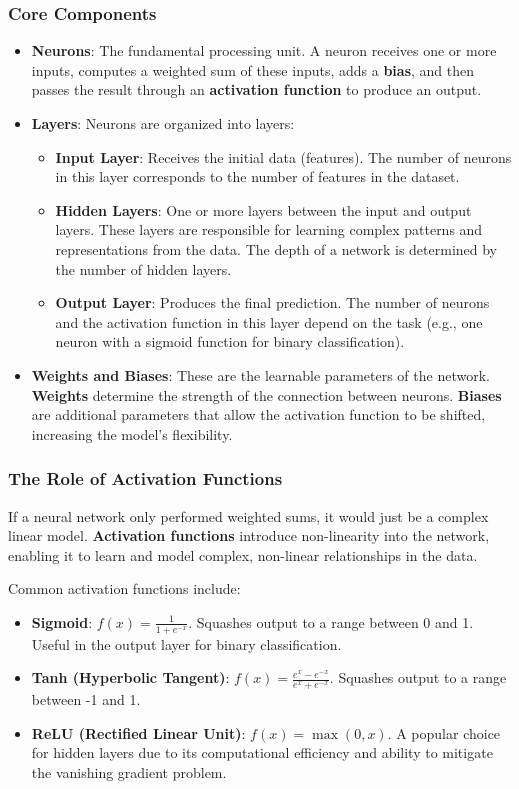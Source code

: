 \documentclass[11pt,a4paper]{article}
\begin{document}
\subsubsection{Core Components}
\begin{itemize}
    \item \textbf{Neurons}: The fundamental processing unit. A neuron receives one or more inputs, computes a weighted sum of these inputs, adds a \textbf{bias}, and then passes the result through an \textbf{activation function} to produce an output.
    \item \textbf{Layers}: Neurons are organized into layers:
        \begin{itemize}
            \item \textbf{Input Layer}: Receives the initial data (features). The number of neurons in this layer corresponds to the number of features in the dataset.
            \item \textbf{Hidden Layers}: One or more layers between the input and output layers. These layers are responsible for learning complex patterns and representations from the data. The depth of a network is determined by the number of hidden layers.
            \item \textbf{Output Layer}: Produces the final prediction. The number of neurons and the activation function in this layer depend on the task (e.g., one neuron with a sigmoid function for binary classification).
        \end{itemize}
    \item \textbf{Weights and Biases}: These are the learnable parameters of the network. \textbf{Weights} determine the strength of the connection between neurons. \textbf{Biases} are additional parameters that allow the activation function to be shifted, increasing the model's flexibility.
\end{itemize}

\subsubsection{The Role of Activation Functions}

If a neural network only performed weighted sums, it would just be a complex linear model. \textbf{Activation functions} introduce non-linearity into the network, enabling it to learn and model complex, non-linear relationships in the data.

Common activation functions include:
\begin{itemize}
    \item \textbf{Sigmoid}: $f(x) = \frac{1}{1 + e^{-x}}$. Squashes output to a range between 0 and 1. Useful in the output layer for binary classification.
    \item \textbf{Tanh (Hyperbolic Tangent)}: $f(x) = \frac{e^x - e^{-x}}{e^x + e^{-x}}$. Squashes output to a range between -1 and 1.
    \item \textbf{ReLU (Rectified Linear Unit)}: $f(x) = \max(0, x)$. A popular choice for hidden layers due to its computational efficiency and ability to mitigate the vanishing gradient problem.
\end{itemize}
\end{document}
